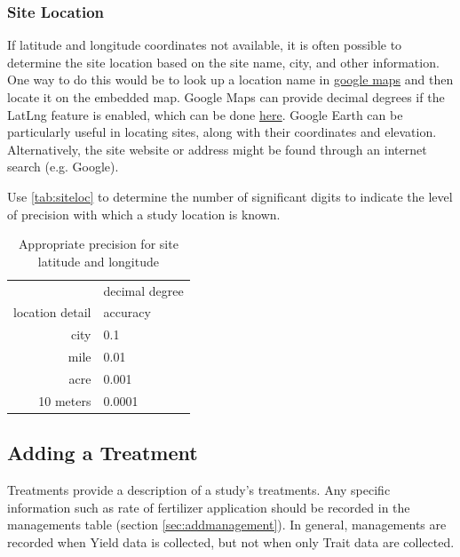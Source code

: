 \documentclass[12pt,english,portrait]{article}
\begin{document}
\subsubsection{Site Location}


 If latitude and longitude coordinates not available, it is often possible to determine the site location based on the site name, city, and other information.
 One way to do this would be to look up a location name in \href{http://maps.google.com}{google maps} and then locate it on the embedded map.
 Google Maps can provide decimal degrees if the LatLng feature is enabled, which can be done \href{http://maps.google.com/maps?showlabs=1}{here}.
 Google Earth can be particularly useful in locating sites, along with their coordinates and elevation.
 Alternatively, the site website or address might be found through an internet search (e.g. Google).

 Use \autoref{tab:siteloc} to determine the number of significant digits to indicate the level of precision with which a study location is known.

\begin{table}
\caption{Appropriate precision for site latitude and longitude}
\label{tab:siteloc}
\begin{tabular}{rl}
\hline
                  & decimal degree\\
 location detail  &   accuracy  \\
\hline
 city             &                      0.1  \\
 mile             &                     0.01  \\
 acre             &                    0.001  \\
 10 meters        &                   0.0001  \\
\hline
\end{tabular}
\end{table}


\subsection{Adding a Treatment}\label{sec:addtreatment}
 Treatments provide a description of a study's treatments. 
 Any specific information such as rate of fertilizer application should be recorded in the managements table (section \autoref{sec:addmanagement}).
 In general, managements are recorded when Yield data is collected, but not when only Trait data are collected.

\end{document}
